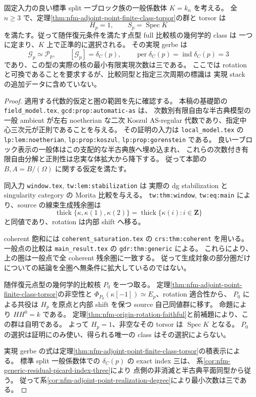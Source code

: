 \begin{corollary}
\label{cor:nfm-generic-adjoint-class-unique}
固定入力の良い標準 split 一ブロック族の一般係数体 $K=k_n$ を考える。
全 $n\ge3$ で、定理\ref{thm:nfm-adjoint-point-finite-class-torsor}の群と torsor は
\[
 H_p=1,\qquad S_p=\operatorname{Spec}K
\]
を満たす。従って随伴復元条件を満たす点型 full 比較核の幾何学的 class は
一つに定まり、$K$ 上で正準的に選択される。
その実現 gerbe は
\[
 \mathscr G_p\simeq\mathscr P_p,
 \qquad [\mathscr G_p]=\delta_C(p),
 \qquad \operatorname{per}\delta_C(p)=\operatorname{ind}\delta_C(p)=3
\]
であり、この型の実際の核の最小有限実現次数は三である。
ここでは rotation と可換であることを要求するが、比較同型と指定三次周期の標識は
実現 stack の追加データに含めていない。
\end{corollary}

\begin{proof}
適用する代数的仮定と圏の範囲を先に確認する。
本稿の基礎節の
\texttt{field\_model.tex}, \texttt{gcd:prop:automatic-as} は、
次数別有限自由な半古典模型の一般 ambient が左右 noetherian な二次 Koszul
AS-regular 代数であり、指定中心三次元が正則であることを与える。
その証明の入力は \texttt{local\_model.tex} の
\texttt{lp:lem:noetherian}, \texttt{lp:prop:koszul},
\texttt{lp:prop:gorenstein} である。
良い一ブロック表示の一般体はこの支配的な半古典族へ埋め込まれ、
これらの次数付き有限自由分解と正則性は忠実な体拡大から降下する。
従って本節の $B,A=B/(\Omega)$ に関する仮定を満たす。

同入力 \texttt{window.tex}, \texttt{tw:lem:stabilization} は
実際の dg stabilization と singularity category の Morita 比較を与える。
\texttt{tw:thm:window}, \texttt{tw:eq:main} により、source の線束生成残余圏は
\[
 \operatorname{thick}\{\kappa,\kappa(1),\kappa(2)\}
 =\operatorname{thick}\{\kappa(i):i\in\mathbf Z\}
\]
と同値であり、rotation は内部 shift へ移る。

coherent 飽和には \texttt{coherent\_saturation.tex} の
\texttt{crs:thm:coherent} を用いる。
一般点の比較は \texttt{main\_result.tex} の
\texttt{gdr:thm:generic} による。
これらにより、上の圏は一般点で全 coherent 残余圏に一致する。
従って生成対象の部分圏だけについての結論を全圏へ無条件に拡大しているのではない。

随伴復元点型の幾何学的比較核 $P_0$ を一つ取る。
定理\ref{thm:nfm-adjoint-point-finite-class-torsor}の非空性と
$\Phi_{P_0}(\kappa[-1])\simeq E_p$、rotation 適合性から、
$P_0$ による共役は $H_p$ を原点と内部 shift を保つ source 自己同値群に移す。
命題により $HH^0=k$ である。
定理\ref{thm:nfm-origin-rotation-faithful}と前補題により、この群は自明である。
よって $H_p=1$、非空なその torsor は $\operatorname{Spec}K$ となる。
$P_0$ の選択は証明にのみ使い、得られる唯一の class はその選択によらない。

実現 gerbe の式は定理\ref{thm:nfm-adjoint-point-finite-class-torsor}の積表示による。
標準 split 一般係数体での $\delta_C(p)$ の exact index 三は、
系\ref{cor:nfm-generic-residual-picard-index-three}により
点側の非消滅と半古典平面同型から従う。
従って系\ref{cor:nfm-adjoint-point-realization-degree}により最小次数は三である。
\end{proof}

